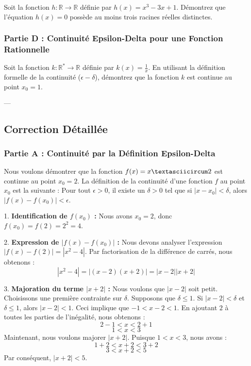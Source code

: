 \documentclass[12pt,a4paper]{report}
\begin{document}
Soit la fonction $h: \mathbb{R} \to \mathbb{R}$ définie par $h(x) = x^3 - 3x + 1$.
Démontrez que l'équation $h(x) = 0$ possède au moins trois racines réelles distinctes.

\subsubsection{Partie D : Continuité Epsilon-Delta pour une Fonction Rationnelle}

Soit la fonction $k: \mathbb{R}^* \to \mathbb{R}$ définie par $k(x) = \frac{1}{x}$.
En utilisant la définition formelle de la continuité ($\epsilon-\delta$), démontrez que la fonction $k$ est continue au point $x_0 = 1$.

---

\subsection{Correction Détaillée}

\subsubsection{Partie A : Continuité par la Définition Epsilon-Delta}

Nous voulons démontrer que la fonction $f(x) = x\textasciicircum 2$ est continue au point $x_0 = 2$.
La définition de la continuité d'une fonction $f$ au point $x_0$ est la suivante :
Pour tout $\epsilon > 0$, il existe un $\delta > 0$ tel que si $|x - x_0| < \delta$, alors $|f(x) - f(x_0)| < \epsilon$.

1.  \textbf{Identification de $f(x_0)$ :}
    Nous avons $x_0 = 2$, donc $f(x_0) = f(2) = 2^2 = 4$.

2.  \textbf{Expression de $|f(x) - f(x_0)|$ :}
    Nous devons analyser l'expression $|f(x) - f(2)| = |x^2 - 4|$.
    Par factorisation de la différence de carrés, nous obtenons :
    $$ |x^2 - 4| = |(x - 2)(x + 2)| = |x - 2| |x + 2| $$

3.  \textbf{Majoration du terme $|x+2|$ :}
    Nous voulons que $|x - 2|$ soit petit. Choisissons une première contrainte sur $\delta$. Supposons que $\delta \le 1$.
    Si $|x - 2| < \delta$ et $\delta \le 1$, alors $|x - 2| < 1$.
    Ceci implique que $-1 < x - 2 < 1$.
    En ajoutant $2$ à toutes les parties de l'inégalité, nous obtenons :
    $$ 2 - 1 < x < 2 + 1 $$
    $$ 1 < x < 3 $$
    Maintenant, nous voulons majorer $|x + 2|$. Puisque $1 < x < 3$, nous avons :
    $$ 1 + 2 < x + 2 < 3 + 2 $$
    $$ 3 < x + 2 < 5 $$
    Par conséquent, $|x + 2| < 5$.
\end{document}
